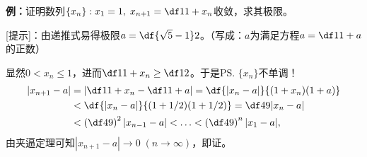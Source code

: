 {\bf 例：}证明数列$\{x_n\}:x_1=1,\;x_{n+1}=\df1{1+x_n}$收敛，求其极限。

[提示]：由递推式易得极限$a=\df{\sqrt5-1}2$。（写成：$a$为满足方程$a=\df1{1+a}$的正数）

显然$0<x_n\leq1$，进而$\df1{1+x_n}\geq\df12$。于是\ps{$\{x_n\}$不单调！}
\begin{align}
	|x_{n+1}-a|&=\left|\df1{1+x_n}-\df1{1+a}\right|=\df{|x_n-a|}{(1+x_n)(1+a)}\notag\\
	&<\df{|x_n-a|}{(1+1/2)(1+1/2)}=\df49|x_n-a|\notag\\
	&<\left(\df49\right)^2|x_{n-1}-a|<\ldots<\left(\df49\right)^{n}|x_1-a|,\notag
\end{align}
由夹逼定理可知$|x_{n+1}-a|\to0\;(n\to\infty)$，即证。

% 	
% 	
% 	
% 	
% 	
% 	
% 	
% 	
% 	

